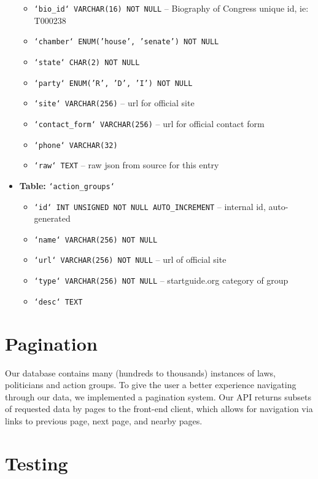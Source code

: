 \documentclass[12pt]{article}
\newcommand{\code}[1]{\texttt{#1}}
\begin{document}
\begin{itemize}[font=\bfseries,leftmargin=0px,label=]
\begin{itemize}
		\item \code{`bio\_id` VARCHAR(16) NOT NULL}				-- Biography of Congress unique id, ie: T000238
		\item \code{`chamber` ENUM('house', 'senate') NOT NULL}
		\item \code{`state` CHAR(2) NOT NULL}
		\item \code{`party` ENUM('R', 'D', 'I') NOT NULL}
		\item \code{`site` VARCHAR(256)}						-- url for official site
		\item \code{`contact\_form` VARCHAR(256)}				-- url for official contact form
		\item \code{`phone` VARCHAR(32)}
		\item \code{`raw` TEXT}									-- raw json from source for this entry
	\end{itemize}
	\item \textbf{Table:} \code{`action\_groups`}
	\begin{itemize}
		\item \code{`id` INT UNSIGNED NOT NULL AUTO\_INCREMENT}	-- internal id, auto-generated
		\item \code{`name` VARCHAR(256) NOT NULL}
		\item \code{`url` VARCHAR(256) NOT NULL}				-- url of official site
		\item \code{`type` VARCHAR(256) NOT NULL}				-- startguide.org category of group
		\item \code{`desc` TEXT}
	\end{itemize}
\end{itemize}


\section{Pagination}

Our database contains many (hundreds to thousands) instances of laws, politicians and action groups. To give the user a better experience navigating through our data, we implemented a pagination system. Our API returns subsets of requested data by pages to the front-end client, which allows for navigation via links to previous page, next page, and nearby pages.

\section{Testing}
\end{document}
